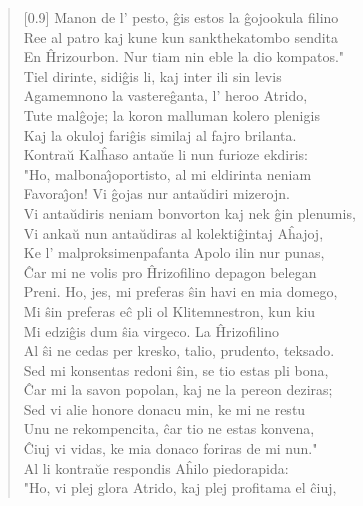 \begin{verse}[0.9\textwidth]
          Manon de l' pesto, \^gis estos la \^gojookula filino\\
          Ree al patro kaj kune kun sankthekatombo sendita\\
          En \^Hrizourbon. Nur tiam nin eble la dio kompatos."\\
           \vin  Tiel dirinte, sidi\^gis li, kaj inter ili sin levis\\
          Agamemnono la vastere\^ganta, l' heroo Atrido,\\
          Tute mal\^goje; la koron malluman kolero plenigis\\
          Kaj la okuloj fari\^gis similaj al fajro brilanta.\\
          Kontra\u u Kal\^haso anta\u ue li nun furioze ekdiris:\\
          \vin   "Ho, malbona\^{\j}oportisto, al mi eldirinta neniam\\
          Favora\^{\j}on! Vi \^gojas nur anta\u udiri mizerojn.\\
          Vi anta\u udiris neniam bonvorton kaj nek \^gin plenumis,\\
          Vi anka\u u nun anta\u udiras al kolekti\^gintaj A\^hajoj,\\
          Ke l' malproksimenpafanta Apolo ilin nur punas,\\
          \^Car mi ne volis pro \^Hrizofilino depagon belegan\\
          Preni. Ho, jes, mi preferas \^sin havi en mia domego,\\
          Mi \^sin preferas e\^c pli ol Klitemnestron, kun kiu\\
          Mi edzi\^gis dum \^sia virgeco. La \^Hrizofilino\\
          Al \^si ne cedas per kresko, talio, prudento, teksado.\\
          Sed mi konsentas redoni \^sin, se tio estas pli bona,\\
          \^Car mi la savon popolan, kaj ne la pereon deziras;\\
          Sed vi alie honore donacu min, ke mi ne restu\\
          Unu ne rekompencita, \^car tio ne estas konvena,\\
          \^Ciuj vi vidas, ke mia donaco foriras de mi nun."\\
          Al li kontra\u ue respondis A\^hilo piedorapida:\\
          "Ho, vi plej glora Atrido, kaj plej profitama el \^ciuj,\\

\end{verse}
